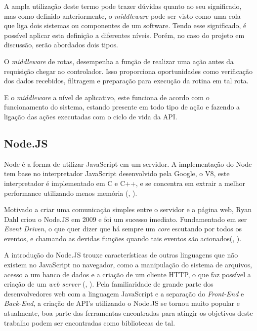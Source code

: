 \begin{enumerate}
  A ampla utilização deste termo pode trazer dúvidas quanto ao seu significado, mas como definido anteriormente, o \textit{middleware} pode ser visto como uma cola que liga dois sistemas ou componentes de um software. Tendo esse significado, é possível aplicar esta definição a diferentes níveis. Porém, no caso do projeto em discussão, serão abordados dois tipos.
  
  O \textit{middleware} de rotas, desempenha a função de realizar uma ação antes da requisição chegar ao controlador. Isso proporciona oportunidades como verificação dos dados recebidos, filtragem e preparação para execução da rotina em tal rota.
  
  E o \textit{middleware} a nível de aplicativo, este funciona de acordo com o funcionamento do sistema, estando presente em todo tipo de ação e fazendo a ligação das ações executadas com o ciclo de vida da API.
  
\subsection{Node.JS}

Node é a forma de utilizar JavaScript em um servidor. A implementação do Node tem base no interpretador JavaScript desenvolvido pela Google, o V8, este interpretador é implementado em C e C++, e se concentra em extrair a melhor performance utilizando menos memória (\citeauthor{tilkov2010node}, \citeyear{tilkov2010node}). 

Motivado a criar uma comunicação simples entre o servidor e a página web, Ryan Dahl criou o Node.JS em 2009 e foi um sucesso imediato. Fundamentado em ser \textit{Event Driven}, o que quer dizer que há sempre um \textit{core} escutando por todos os eventos, e chamando as devidas funções quando tais eventos são acionados(\citeauthor{shah2017node}, \citeyear{shah2017node}).

A introdução do Node.JS trouxe características de outras linguagens que não existem no JavaScript no navegador, como a manipulação do sistema de arquivos, acesso a um banco de dados e a criação de um cliente HTTP, o que faz possível a criação de um \textit{web server}  (\citeauthor{mead2018learning}, \citeyear{mead2018learning}). Pela familiaridade de grande parte dos desenvolvedores web com a linguagem JavaScript e a separação do \textit{Front-End} e \textit{Back-End}, a criação de API's utilizando o Node.JS se tornou muito popular e atualmente, boa parte das ferramentas encontradas para atingir os objetivos deste trabalho podem ser encontradas como bibliotecas de tal.


\end{enumerate}
